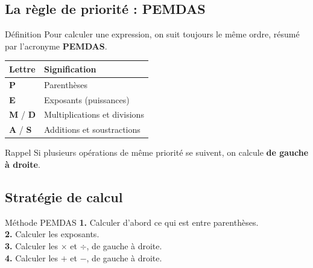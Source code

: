 \newpage
\semaineinvisible
{}

\vfill
\subsection{La règle de priorité : PEMDAS}

\vspace{-4pt}\begin{regle}{Définition}
Pour calculer une expression, on suit toujours le même ordre, résumé par l'acronyme \textcolor{themeColor}{\textbf{PEMDAS}}.
\end{regle}

\def\arraystretch{1.2}
\begin{tabularx}{\linewidth}{|>{\centering\arraybackslash}p{3cm}|X|}
\hline
\cellcolor{themeNO!30}\textbf{Lettre} & \cellcolor{themeNO!30}\textbf{Signification} \\\hline
\textbf{P} & Parenthèses \\\hline
\textbf{E} & Exposants (puissances) \\\hline
\textbf{M} / \textbf{D} & Multiplications et divisions \\\hline
\textbf{A} / \textbf{S} & Additions et soustractions \\\hline
\end{tabularx}
\def\arraystretch{1}

\begin{astuce}{Rappel}
Si plusieurs opérations de même priorité se suivent, on calcule \textbf{de gauche à droite}.
\end{astuce}

\subsection{Stratégie de calcul}

\vspace{-4pt}\begin{astuce}{Méthode PEMDAS}
\textbf{1.} Calculer d'abord ce qui est entre parenthèses.\\
\textbf{2.} Calculer les exposants.\\
\textbf{3.} Calculer les $\times$ et $\div$, de gauche à droite.\\
\textbf{4.} Calculer les $+$ et $-$, de gauche à droite.
\end{astuce}

